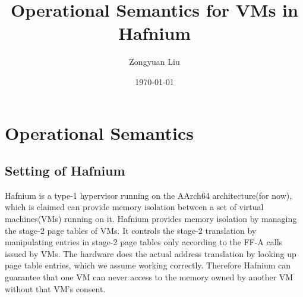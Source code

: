 \documentclass[a4paper]{article}
\title{Operational Semantics %
  for VMs in Hafnium} \date{\today}
\author{Zongyuan Liu}
\begin{document}
\maketitle

\section{Operational Semantics}

\subsection{Setting of Hafnium}
Hafnium is a type-1 hypervisor running on the AArch64 architecture(for now),
which is claimed can provide memory isolation between a set of virtual
machines(VMs) running on it. Hafnium provides memory isolation by managing the
stage-2 page tables of VMs. It controls the stage-2 translation by manipulating
entries in stage-2 page tables only according to the FF-A calls issued by VMs.
The hardware does the actual address translation by looking up page table
entries, which we assume working correctly. Therefore Hafnium can
guarantee that one VM can never access to the memory owned by another VM without
that VM's consent.
\end{document}
